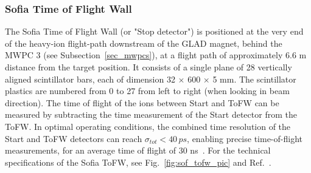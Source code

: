 
\subsubsection{Sofia Time of Flight Wall}
The Sofia Time of Flight Wall (or "Stop detector") is positioned at the very end of the heavy-ion flight-path downstream of the GLAD magnet, behind the MWPC 3 (see Subsection~\ref{sec_mwpcs}), at a flight path of approximately 6.6 m distance from the target position. It consists of a single plane of 28 vertically aligned scintillator bars, each of dimension 32 $\times$ 600 $\times$ 5 mm. The scintillator plastics are numbered from 0 to 27 from left to right (when looking in beam direction). The time of flight of the ions between Start and ToFW can be measured by subtracting the time measurement of  the Start detector from the ToFW. In optimal operating conditions, the combined time resolution of the Start and ToFW detectors can reach $\sigma_{tot} < 40\,ps$, enabling precise time-of-flight measurements, for an average time of flight of 30 ns~\cite{martin2021fission}. For the technical specifications of the Sofia ToFW, see Fig.~\ref{fig:sof_tofw_pic} and Ref.~\cite{bail2011time}.

